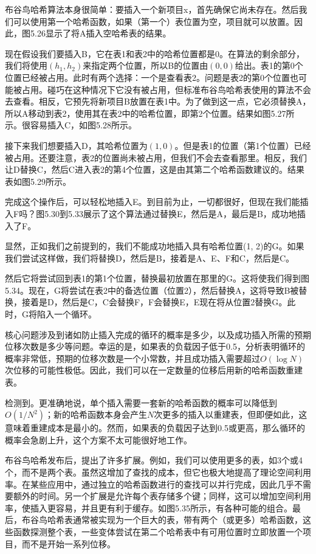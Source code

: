 \documentclass[a4paper]{ctexart}
\theoremstyle{definition}
\theoremstyle{definition}
\begin{document}
布谷鸟哈希算法本身很简单：要插入一个新项目x，首先确保它尚未存在。然后我们可以使用第一个哈希函数，如果（第一个）表位置为空，项目就可以放置。因此，图5.26显示了将A插入空哈希表的结果。

现在假设我们要插入B，它在表1和表2中的哈希位置都是0。在算法的剩余部分，我们将使用\( (h_1, h_2) \)来指定两个位置，所以B的位置由\( (0,0) \)给出。表1的第0个位置已经被占用。此时有两个选择：一个是查看表2。问题是表2的第0个位置也可能被占用。碰巧在这种情况下它没有被占用，但标准布谷鸟哈希表使用的算法不会去查看。相反，它预先将新项目B放置在表1中。为了做到这一点，它必须替换A，所以A移动到表2，使用其在表2中的哈希位置，即第2个位置。结果如图5.27所示。很容易插入C，如图5.28所示。

接下来我们想要插入D，其哈希位置为\( (1, 0) \)。但是表1的位置（第1个位置）已经被占用。还要注意，表2的位置尚未被占用，但我们不会去查看那里。相反，我们让D替换C，然后C进入表2的第4个位置，这是由其第二个哈希函数建议的。结果表如图5.29所示。

完成这个操作后，可以轻松地插入E。到目前为止，一切都很好，但现在我们能插入F吗？图5.30到5.33展示了这个算法通过替换E，然后是A，最后是B，成功地插入了F。

显然，正如我们之前提到的，我们不能成功地插入具有哈希位置(1, 2)的G。如果我们尝试这样做，我们将替换D，然后是B，接着是A、E、F和C，然后是C。

然后它将尝试回到表1的第1个位置，替换最初放置在那里的G。这将使我们得到图5.34。现在，G将尝试在表2中的备选位置（位置2），然后替换A，这将导致B被替换，接着是D，然后是C，C会替换F，F会替换E，E现在将从位置2替换G。此时，G将陷入一个循环。

核心问题涉及到诸如防止插入完成的循环的概率是多少，以及成功插入所需的预期位移次数是多少等问题。幸运的是，如果表的负载因子低于0.5，分析表明循环的概率非常低，预期的位移次数是一个小常数，并且成功插入需要超过\( O(\log N) \)次位移的可能性极低。因此，我们可以在一定数量的位移后用新的哈希函数重建表。

检测到。更准确地说，单个插入需要一套新的哈希函数的概率可以降低到\( O(1/N^2) \)；新的哈希函数本身会产生\( N \)次更多的插入以重建表，但即便如此，这意味着重建成本是最小的。然而，如果表的负载因子达到0.5或更高，那么循环的概率会急剧上升，这个方案不太可能很好地工作。

布谷鸟哈希发布后，提出了许多扩展。例如，我们可以使用更多的表，如3个或4个，而不是两个表。虽然这增加了查找的成本，但它也极大地提高了理论空间利用率。在某些应用中，通过独立的哈希函数进行的查找可以并行完成，因此几乎不需要额外的时间。另一个扩展是允许每个表存储多个键；同样，这可以增加空间利用率，使插入更容易，并且更有利于缓存。如图5.35所示，有各种可能的组合。最后，布谷鸟哈希表通常被实现为一个巨大的表，带有两个（或更多）哈希函数，这些函数探测整个表，一些变体尝试在第二个哈希表中有可用位置时立即放置一个项目，而不是开始一系列位移。
\end{document}

